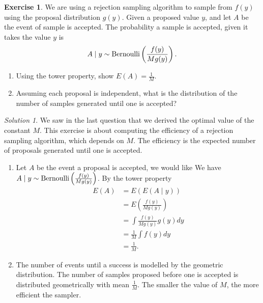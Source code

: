 \documentclass[
]{book}
\providecommand{\tightlist}{%
  \setlength{\itemsep}{0pt}\setlength{\parskip}{0pt}}
\theoremstyle{definition}
\theoremstyle{definition}
\theoremstyle{definition}
\newtheorem{exercise}{Exercise}[chapter]
\theoremstyle{definition}
\theoremstyle{remark}
\newtheorem*{solution}{Solution}
\begin{document}
\begin{exercise}

We are using a rejection sampling algorithm to sample from \(f(y)\) using the proposal distribution \(g(y)\). Given a proposed value \(y\), and let \(A\) be the event of sample is accepted. The probability a sample is accepted, given it takes the value \(y\) is
\[
A \mid y \sim \hbox{Bernoulli}\left(\frac{f(y)}{Mg(y)}\right).
\]

\begin{enumerate}
\def\labelenumi{\arabic{enumi}.}
\tightlist
\item
  Using the tower property, show \(E(A) = \frac{1}{M}\).\\
\item
  Assuming each proposal is independent, what is the distribution of the number of samples generated until one is accepted?
\end{enumerate}

\end{exercise}

\begin{solution}

We saw in the last question that we derived the optimal value of the constant \(M\). This exercise is about computing the efficiency of a rejection sampling algorithm, which depends on \(M\). The efficiency is the expected number of proposals generated until one is accepted.

\begin{enumerate}
\def\labelenumi{\arabic{enumi}.}
\tightlist
\item
  Let \(A\) be the event a proposal is accepted, we would like We have \(A \mid y \sim \hbox{Bernoulli}\left(\frac{f(y)}{Mg(y)}\right)\). By the tower property
  \begin{align*}
  E(A) & = E(E(A\mid y)) \\
  & = E\left(\frac{f(y)}{Mg(y)}\right) \\
  & = \int \frac{f(y)}{Mg(y)} g(y) dy \\
  & = \frac{1}{M}\int f(y) dy \\
  & = \frac{1}{M}.
  \end{align*}
\item
  The number of events until a success is modelled by the geometric distribution. The number of samples proposed before one is accepted is distributed geometrically with mean \(\frac{1}{M}\). The smaller the value of \(M\), the more efficient the sampler.
\end{enumerate}

\end{solution}
\end{document}
